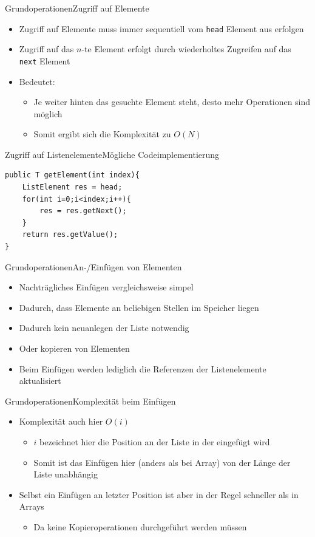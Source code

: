 \begin{frame}{Grundoperationen}{Zugriff auf Elemente}
	\begin{itemize}
		\item Zugriff auf Elemente muss immer sequentiell vom \texttt{head} Element aus erfolgen
		\item Zugriff auf das $n$-te Element erfolgt durch wiederholtes Zugreifen auf das \texttt{next} Element
		\item Bedeutet:
		\begin{itemize}
			\item Je weiter hinten das gesuchte Element steht, desto mehr Operationen sind möglich
			\item Somit ergibt sich die Komplexität zu $O(N)$
		\end{itemize}
	\end{itemize}
\end{frame}

\begin{frame}[fragile]{Zugriff auf Listenelemente}{Mögliche Codeimplementierung}
\lstset{style=java}
\begin{lstlisting}
public T getElement(int index){
	ListElement res = head;
	for(int i=0;i<index;i++){
		res = res.getNext();
	}
	return res.getValue();
}
\end{lstlisting}
\end{frame}

\begin{frame}{Grundoperationen}{An-/Einfügen von Elementen}
	\begin{itemize}
		\item Nachträgliches Einfügen vergleichsweise simpel
		\item Dadurch, dass Elemente an beliebigen Stellen im Speicher liegen
		\item Dadurch kein neuanlegen der Liste notwendig
		\item Oder kopieren von Elementen
		\item Beim Einfügen werden lediglich die Referenzen der Listenelemente aktualisiert
	\end{itemize}
\end{frame}

\begin{frame}{Grundoperationen}{Komplexität beim Einfügen}
	\begin{itemize}
		\item Komplexität auch hier $O(i)$
		\begin{itemize}
			\item $i$ bezeichnet hier die Position an der Liste in der eingefügt wird
			\item Somit ist das Einfügen hier (anders als bei Array) von der Länge der Liste unabhängig
		\end{itemize}
		\item Selbst ein Einfügen an letzter Position ist aber in der Regel schneller als in Arrays
		\begin{itemize}
			\item Da keine Kopieroperationen durchgeführt werden müssen
		\end{itemize}
	\end{itemize}
\end{frame}

